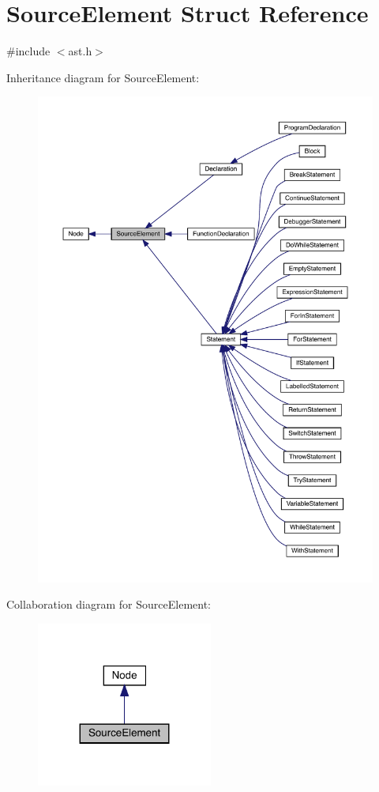 \hypertarget{struct_source_element}{}\section{Source\+Element Struct Reference}
\label{struct_source_element}


{\ttfamily \#include $<$ast.\+h$>$}



Inheritance diagram for Source\+Element\+:
\nopagebreak
\begin{figure}[H]
\begin{center}
\leavevmode
\includegraphics[width=350pt]{struct_source_element__inherit__graph}
\end{center}
\end{figure}


Collaboration diagram for Source\+Element\+:
\nopagebreak
\begin{figure}[H]
\begin{center}
\leavevmode
\includegraphics[width=164pt]{struct_source_element__coll__graph}
\end{center}
\end{figure}
